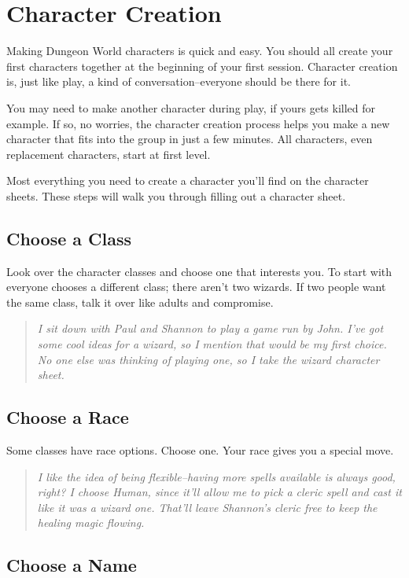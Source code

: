 \chapter{Character Creation}


 Making Dungeon World characters is quick and easy. You should all create your first characters together at the beginning of your first session. Character creation is, just like play, a kind of conversation--everyone should be there for it.


 You may need to make another character during play, if yours gets killed for example. If so, no worries, the character creation process helps you make a new character that fits into the group in just a few minutes. All characters, even replacement characters, start at first level.


 Most everything you need to create a character you'll find on the character sheets. These steps will walk you through filling out a character sheet.
\section{Choose a Class}


 Look over the character classes and choose one that interests you. To start with everyone chooses a different class; there aren't two wizards. If two people want the same class, talk it over like adults and compromise.

\begin{quote}
\emph{ I sit down with Paul and Shannon to play a game run by John. I've got some cool ideas for a wizard, so I mention that would be my first choice. No one else was thinking of playing one, so I take the wizard character sheet.}
\end{quote}
\section{Choose a Race}


 Some classes have race options. Choose one. Your race gives you a special move.


\begin{quote}
\emph{ I like the idea of being flexible--having more spells available is always good, right? I choose Human, since it'll allow me to pick a cleric spell and cast it like it was a wizard one. That'll leave Shannon's cleric free to keep the healing magic flowing.}
\end{quote}
\section{Choose a Name}


